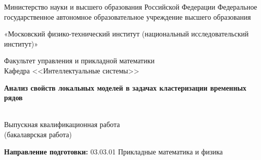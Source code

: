 \begin{titlepage}
    	\begin{center}
        		Министерство науки и высшего образования Российской Федерации Федеральное государственное автономное образовательное учреждение высшего образования
       
		«Московский физико-технический институт (национальный исследовательский институт)»

        		Факультет управления и прикладной математики\\
        		Кафедра <<Интеллектуальные системы>>\\
    	\end{center}

    	\vspace{2cm}

    	\begin{center}
       		\Large \bf Анализ свойств локальных моделей в задачах кластеризации временных рядов
    	\end{center}
    
    	\begin{center}
		~\\[-28pt]
		Выпускная квалификационная работа\\
		(бакалаврская работа)
	\end{center}
	
	\vspace{0.1cm}
	    
    \begin{center}
    	\textbf{Направление подготовки:} 03.03.01 Прикладные математика и физика
    \end{center}

   \vspace{0.1cm}


\end{titlepage}

